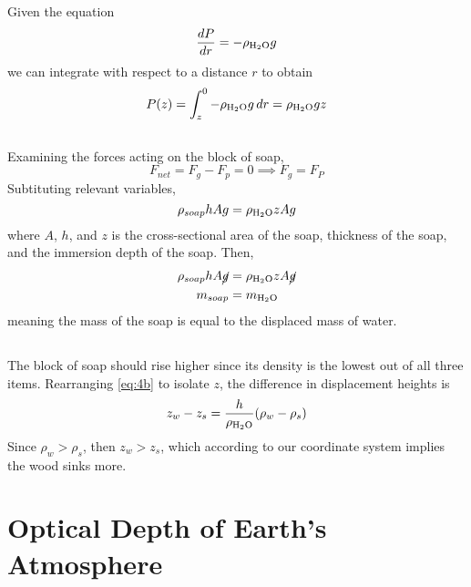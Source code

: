 \documentclass{article}
\newcommand{\water}{\ce{H2O}}
\begin{document}
Given the equation
\begin{equation}
    \frac{dP}{dr} = -\rho_{\water} g
\end{equation}
we can integrate with respect to a distance \(r\) to obtain
\begin{equation}
    P(z) = \int_z^0 -\rho_{\water} g \, dr = \rho_{\water} g z
\end{equation}

\subsection{}

Examining the forces acting on the block of soap,
\begin{equation}
    F_{net} = F_g - F_p = 0 \implies F_g = F_P
\end{equation}
Subtituting relevant variables,
\begin{equation}
    \rho_{soap} h A g = \rho_{\water} z A g
\end{equation}
where \(A\), \(h\), and \(z\) is the cross-sectional area of the soap, thickness of the soap, and the immersion depth of the soap.
Then,
\begin{align}
    \rho_{soap} h A \cancel{g} &= \rho_{\water} z A \cancel{g} \label{eq:4b} \\
    m_{soap} &= m_{\water}
\end{align}
meaning the mass of the soap is equal to the displaced mass of water.

\subsection{}

The block of soap should rise higher since its density is the lowest out of all three items.
Rearranging \autoref{eq:4b} to isolate \(z\), the difference in displacement heights is
\begin{equation}
    z_w - z_s = \frac{h}{\rho_{\water}} (\rho_w - \rho_s)
\end{equation}
Since \(\rho_w > \rho_s\), then \(z_w > z_s\), which according to our coordinate system implies the wood sinks more.

\section{Optical Depth of Earth's Atmosphere}

\subsection{}
\end{document}
